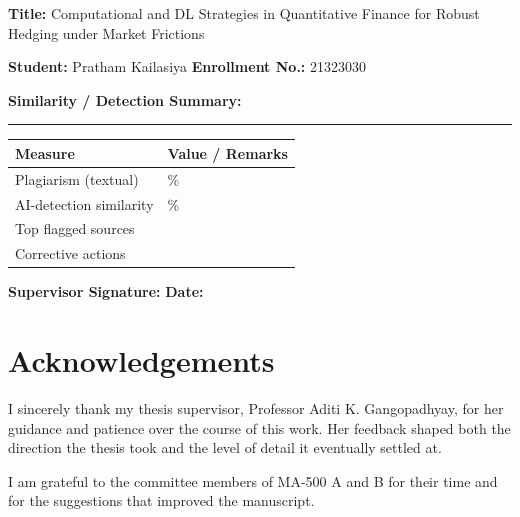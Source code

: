 \documentclass[11pt,oneside]{report}
\begin{document}
\vspace{1cm}

\noindent
\textbf{Title:} Computational and DL Strategies in Quantitative Finance for Robust Hedging under Market Frictions

\vspace{0.3cm}

\noindent
\textbf{Student:} Pratham Kailasiya \hspace{1cm} \textbf{Enrollment No.:} 21323030

\vspace{1cm}

\noindent
\textbf{Similarity / Detection Summary:}

\vspace{0.3cm}

\noindent\rule{\textwidth}{0.5pt}

\vspace{0.3cm}

\begin{tabular}{p{} p{}}
\textbf{Measure} & \textbf{Value / Remarks} \\
\hline
Plagiarism (textual) & \underline{\hspace{1cm}} \% \\[0.4cm]
AI-detection similarity & \underline{\hspace{1cm}} \% \\[0.4cm]
Top flagged sources & \\[0.6cm]
Corrective actions & \\[0.6cm]
\end{tabular}

\vspace{1.5cm}

\noindent
\textbf{Supervisor Signature:} \underline{\hspace{6cm}} \hfill \textbf{Date:} \underline{\hspace{3cm}}

\clearpage
\chapter*{Acknowledgements}

I sincerely thank my thesis supervisor, Professor Aditi K. Gangopadhyay, for her guidance and patience over the course of this work. Her feedback shaped both the direction the thesis took and the level of detail it eventually settled at.

I am grateful to the committee members of MA-500 A and B for their time and for the suggestions that improved the manuscript.
\end{document}
